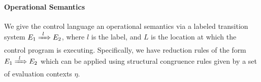 \paragraph{Operational Semantics}
\label{sec:control-lang-semantics}
We give the control language an operational semantics via a labeled transition system $E_1 \ctrlstep[l] E_2$, where $l$ is the label, and $L$ is the location at which the control program is executing.
Specifically, we have reduction rules of the form $E_1 \ctrlstep[l] E_2$ which can be applied using structural congruence rules given by a set of evaluation contexts $\eta$.

\begin{syntax}
  \alternative{\iota}     

     \\
   \\
   \\
   \\
\end{syntax}

